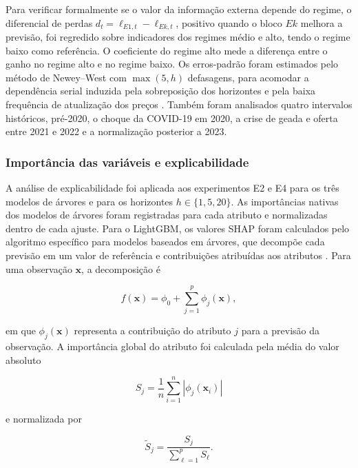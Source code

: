 \documentclass[a4paper,fleqn]{cas-sc}
\begin{document}
Para verificar formalmente se o valor da informação externa depende do regime, o diferencial de perdas \(d_t=\ell_{E1,t}-\ell_{Ek,t}\), positivo quando o bloco \(Ek\) melhora a previsão, foi regredido sobre indicadores dos regimes médio e alto, tendo o regime baixo como referência. O coeficiente do regime alto mede a diferença entre o ganho no regime alto e no regime baixo. Os erros-padrão foram estimados pelo método de Newey--West com \(\max(5,h)\) defasagens, para acomodar a dependência serial induzida pela sobreposição dos horizontes e pela baixa frequência de atualização dos preços \citep{NeweyWest1987}. Também foram analisados quatro intervalos históricos, pré-2020, o choque da COVID-19 em 2020, a crise de geada e oferta entre 2021 e 2022 e a normalização posterior a 2023.

\subsubsection{Importância das variáveis e explicabilidade}
\label{subsec:explainability}

A análise de explicabilidade foi aplicada aos experimentos E2 e E4 para os três modelos de árvores e para os horizontes \(h\in\{1,5,20\}\). As importâncias nativas dos modelos de árvores foram registradas para cada atributo e normalizadas dentro de cada ajuste. Para o LightGBM, os valores SHAP foram calculados pelo algoritmo específico para modelos baseados em árvores, que decompõe cada previsão em um valor de referência e contribuições atribuídas aos atributos \citep{LundbergLee2017SHAP}. Para uma observação \(\mathbf{x}\), a decomposição é

\begin{equation}
f(\mathbf{x})
=
\phi_{0}
+\sum_{j=1}^{p}\phi_{j}(\mathbf{x}),
\label{eq:shap_decomposition}
\end{equation}

em que \(\phi_j(\mathbf{x})\) representa a contribuição do atributo \(j\) para a previsão da observação. A importância global do atributo foi calculada pela média do valor absoluto

\begin{equation}
S_j
=
\frac{1}{n}\sum_{i=1}^{n}
\left\lvert\phi_j(\mathbf{x}_i)\right\rvert
\label{eq:shap_global}
\end{equation}

e normalizada por

\begin{equation}
\widetilde{S}_j
=
\frac{S_j}{\sum_{\ell=1}^{p}S_{\ell}}.
\label{eq:shap_normalized}
\end{equation}
\end{document}
